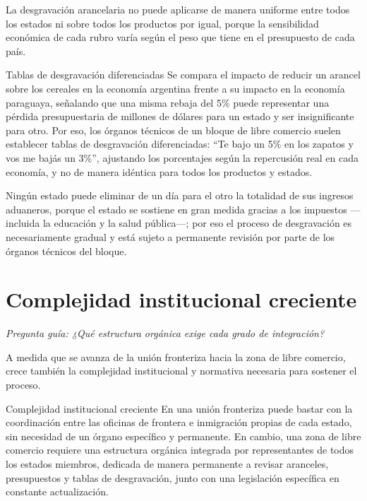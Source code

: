 \documentclass[12pt,oneside]{book}
\begin{document}
La desgravación arancelaria no puede aplicarse de manera uniforme entre todos los estados ni sobre todos los productos por igual, porque la sensibilidad económica de cada rubro varía según el peso que tiene en el presupuesto de cada país.

\begin{example}{Tablas de desgravación diferenciadas}
Se compara el impacto de reducir un arancel sobre los cereales en la economía argentina frente a su impacto en la economía paraguaya, señalando que una misma rebaja del 5\% puede representar una pérdida presupuestaria de millones de dólares para un estado y ser insignificante para otro. Por eso, los órganos técnicos de un bloque de libre comercio suelen establecer tablas de desgravación diferenciadas: ``Te bajo un 5\% en los zapatos y vos me bajás un 3\%'', ajustando los porcentajes según la repercusión real en cada economía, y no de manera idéntica para todos los productos y estados.
\end{example}

Ningún estado puede eliminar de un día para el otro la totalidad de sus ingresos aduaneros, porque el estado se sostiene en gran medida gracias a los impuestos —incluida la educación y la salud pública—; por eso el proceso de desgravación es necesariamente gradual y está sujeto a permanente revisión por parte de los órganos técnicos del bloque.

\section{Complejidad institucional creciente}

\textit{Pregunta guía: ¿Qué estructura orgánica exige cada grado de integración?}

A medida que se avanza de la unión fronteriza hacia la zona de libre comercio, crece también la complejidad institucional y normativa necesaria para sostener el proceso.

\begin{definition}{Complejidad institucional creciente}
En una unión fronteriza puede bastar con la coordinación entre las oficinas de frontera e inmigración propias de cada estado, sin necesidad de un órgano específico y permanente. En cambio, una zona de libre comercio requiere una estructura orgánica integrada por representantes de todos los estados miembros, dedicada de manera permanente a revisar aranceles, presupuestos y tablas de desgravación, junto con una legislación específica en constante actualización.
\end{definition}
\end{document}
